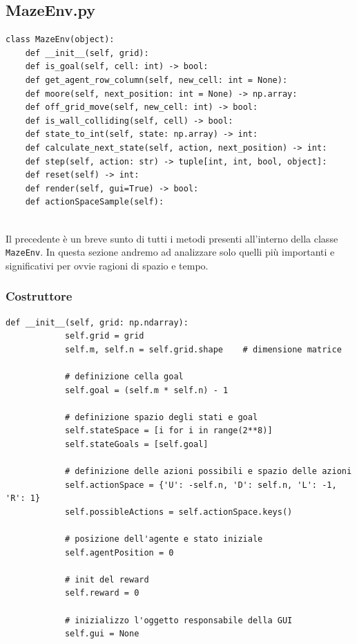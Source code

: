 \subsection{MazeEnv.py}

\begin{lstlisting}[style=python, caption={Metodi di MazeEnv.py}]
class MazeEnv(object):
	def __init__(self, grid):
	def is_goal(self, cell: int) -> bool:
	def get_agent_row_column(self, new_cell: int = None):
	def moore(self, next_position: int = None) -> np.array:
	def off_grid_move(self, new_cell: int) -> bool:
	def is_wall_colliding(self, cell) -> bool:
	def state_to_int(self, state: np.array) -> int:
	def calculate_next_state(self, action, next_position) -> int:
	def step(self, action: str) -> tuple[int, int, bool, object]:
	def reset(self) -> int:
	def render(self, gui=True) -> bool:
	def actionSpaceSample(self):
	
\end{lstlisting}

Il precedente \`{e} un breve sunto di tutti i metodi presenti all'interno della classe \lstinline[style=cmd]|MazeEnv|. In questa sezione andremo ad analizzare solo quelli pi\`{u} importanti e significativi per ovvie ragioni di spazio e tempo.

\subsubsection{Costruttore}

\begin{lstlisting}[style=python, caption={Costruttore di MazeEnv.py}]
    def __init__(self, grid: np.ndarray):
			self.grid = grid
			self.m, self.n = self.grid.shape    # dimensione matrice
			
			# definizione cella goal
			self.goal = (self.m * self.n) - 1
			
			# definizione spazio degli stati e goal
			self.stateSpace = [i for i in range(2**8)]
			self.stateGoals = [self.goal]
			
			# definizione delle azioni possibili e spazio delle azioni
			self.actionSpace = {'U': -self.n, 'D': self.n, 'L': -1, 'R': 1}
			self.possibleActions = self.actionSpace.keys()
			
			# posizione dell'agente e stato iniziale
			self.agentPosition = 0
			
			# init del reward
			self.reward = 0
			
			# inizializzo l'oggetto responsabile della GUI
			self.gui = None
\end{lstlisting}

